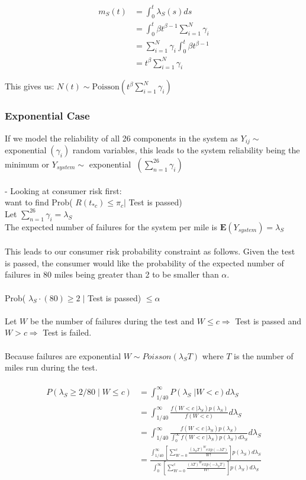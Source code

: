 \documentclass[12pt]{article}
\begin{document}
$$
\begin{aligned}
	m_S(t) &= \int_0^t \lambda_S(s)ds \\
    &= \int_0^t \beta t^{\beta -1} \sum_{i = 1}^N \gamma_i \\
    &= \sum_{i = 1}^N \gamma_i \int_0^t \beta t^{\beta -1} \\
    &= t^\beta \sum_{i = 1}^N \gamma_i
\end{aligned}
$$

This gives us: $N(t) \sim \text{Poisson}(t^\beta \sum_{i = 1}^N \gamma_i)$

\subsubsection{Exponential Case}

If we model the reliability of all 26 components in the system as $Y_{ij} \sim$
exponential$\;(\gamma_i) $ random variables, this leads to the system
reliability being the minimum or $Y_{system} \sim $ exponential
$ \;(\sum_{n = 1}^{26} \gamma_i) $
\\
\\
- Looking at consumer risk first:
\\
want to find Prob( $ R(t_{*c}) \leq \pi_c \vert $ Test is passed)
\\
Let $ \sum_{n = 1}^{26} \gamma_i = \lambda_S $
\\
The expected number of failures for the system per mile is
$ \mathbf{E}(Y_{system}) = \lambda_S $
\\
\\
This leads to our consumer risk probability constraint as follows.  Given the
test is passed, the consumer would like the probability of the expected number
of failures in 80 miles being greater than 2 to be smaller than $\alpha$.
\\
\\
Prob( $ \lambda_S \cdot (80) \geq 2 \; \vert $ Test is passed) $ \leq \alpha $
\\
\\
Let $ W $ be the number of failures during the test and $ W \leq c \Rightarrow $
Test is passed and $ W > c \Rightarrow $ Test is failed.
\\
\\
Because failures are exponential $ W \sim Poisson(\lambda_S T) $ where $ T $ is
the number of miles run during the test.
\\
\\
$$
\begin{aligned}
	 P(\lambda_S \geq 2/80 \; \vert \; W \leq c) &= \int_{1/40}^{\infty} P(\lambda_S \; \vert W < c) d\lambda_S \\
     &= \int_{1/40}^{\infty} \frac{f(W < c \; \vert \lambda_S) p(\lambda_S)}{f(W < c)}d\lambda_S\\
     &= \int_{1/40}^{\infty} \frac{f(W < c \; \vert \lambda_S) p(\lambda_S)}{\int_{0}^{\infty} f(W < c \; \vert \lambda_S) p(\lambda_S) d\lambda_S}d\lambda_S \\
     &= \frac{\int_{1/40}^{\infty} [ \sum_{W=0}^c \frac{(\lambda_S T)^W exp(-\lambda T)}{W!}]p(\lambda_S)d\lambda_S} {\int_{0}^{\infty} [ \sum_{W=0}^c \frac{(\lambda T)^W exp(-\lambda_S T)}{W!}]p(\lambda_S)d\lambda_S}
\end{aligned}
$$
\end{document}
